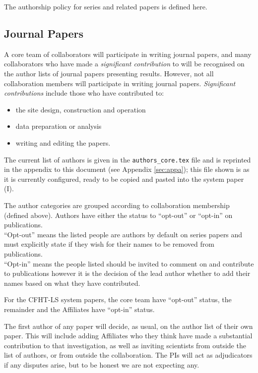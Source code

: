 \documentclass[a4paper]{article}
\begin{document}
The authorship policy for \sw series and related papers is defined here.


\subsection{Journal Papers}
\label{sec:series}

A core team of collaborators will participate in writing journal papers, and
many collaborators who have made a \textit{significant contribution} to \sw
will be recognised on the author lists of journal papers presenting \sw
results.  However, not all collaboration members will participate in writing
journal papers.  \textit{Significant contributions} include those who have
contributed to:
\begin{itemize}
\item the site design, construction and operation
\item data preparation or analysis
\item writing and editing the papers. 
\end{itemize}


The current list of \sw authors is given in the \texttt{authors\_core.tex} file and is reprinted
in the appendix to this document (see Appendix \ref{sec:appa}); this file shown is as it is currently configured, ready to be copied and pasted into the \sw system paper (\sw I). 

\noindent The author categories are grouped according to collaboration membership (defined above). Authors have either the status to ``opt-out'' or ``opt-in'' on \sw publications.  \\
``Opt-out'' means the listed people are authors by default on \sw series papers and must explicitly state if they wish for their names to be removed from \sw publications. \\
``Opt-in'' means the people listed should be invited to comment on and contribute to publications however it is the decision of the lead author whether to add their names based on what they have contributed.

For the CFHT-LS \sw system papers, the core team have ``opt-out'' status, the remainder  and the \sw Affiliates have ``opt-in'' status.

The first author of any \sw paper will decide, as usual, on the author list of their own paper. This will include adding Affiliates who they think have made a substantial contribution to that investigation, as well as inviting scientists from outside the list of \sw authors, or from outside the
collaboration.  The \sw PIs will act as adjudicators if any disputes arise, but to be honest we are not expecting any.
\end{document}
